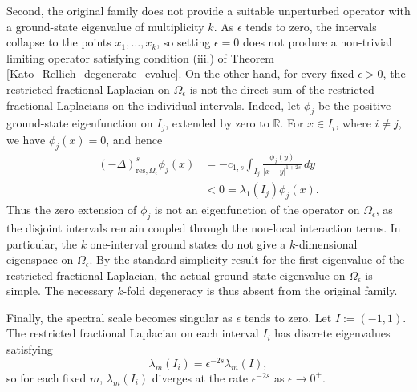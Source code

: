 \documentclass[preprint,12pt]{elsarticle}
\newcommand{\R}{\mathbb R}
\begin{document}
Second, the original family does not provide a suitable unperturbed
operator with a ground-state eigenvalue of multiplicity $k$. As
$\epsilon$ tends to zero, the intervals collapse to the points
$x_1,\ldots,x_k$, so setting $\epsilon=0$ does not produce a
non-trivial limiting operator satisfying condition \textup{(iii.)} of
Theorem \ref{Kato_Rellich_degenerate_evalue}. On the other hand, for every fixed $\epsilon>0$, the restricted fractional Laplacian on $\Omega_\epsilon$
is not the direct sum of the restricted fractional Laplacians on the
individual intervals. Indeed, let $\phi_j$ be the positive
ground-state eigenfunction on $I_j$, extended by zero to $\R$. For
$x\in I_i$, where $i\neq j$, we have $\phi_j(x)=0$, and hence
\[
\begin{aligned}
    (-\Delta)^s_{\mathrm{res},\Omega_\epsilon}\phi_j(x)
    &=
    -c_{1,s}\int_{I_j}
    \frac{\phi_j(y)}{|x-y|^{1+2s}}\,dy\\
    &<0
    =
    \lambda_1(I_j)\phi_j(x).
\end{aligned}
\]
Thus the zero extension of $\phi_j$ is not an eigenfunction of the
operator on $\Omega_\epsilon$, as the disjoint intervals remain coupled
through the non-local interaction terms. In particular, the $k$
one-interval ground states do not give a $k$-dimensional eigenspace on
$\Omega_\epsilon$. By the standard simplicity result for the
first eigenvalue of the restricted fractional Laplacian, the actual
ground-state eigenvalue on $\Omega_\epsilon$ is simple. The necessary
$k$-fold degeneracy is thus absent from the original family.

Finally, the spectral scale becomes singular as $\epsilon$ tends to
zero. Let $I:=(-1,1)$.
The restricted fractional Laplacian on each interval $I_i$ has
discrete eigenvalues satisfying
\[
    \lambda_m(I_i)
    =
    \epsilon^{-2s}\lambda_m(I),
\]
so for each fixed $m$, $\lambda_m(I_i)$ diverges at the rate
$\epsilon^{-2s}$ as $\epsilon\to0^+$.
\end{document}
